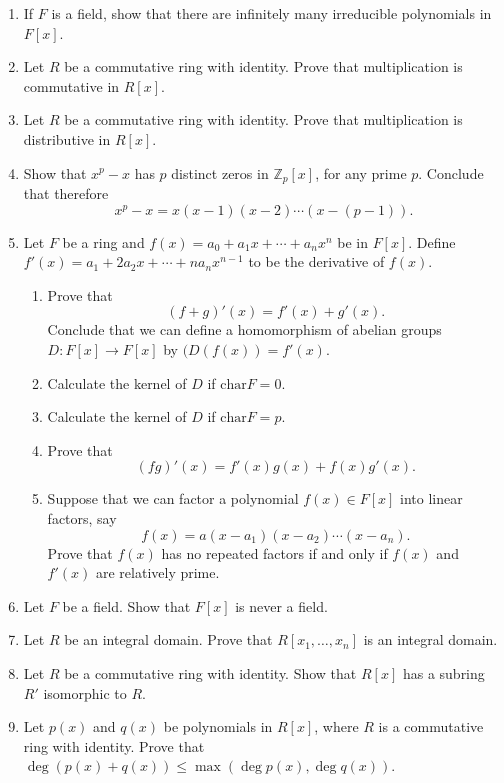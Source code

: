 {\begin{enumerate}
\item
If $F$ is a field, show that there are infinitely many irreducible polynomials in $F[x]$.

\item
Let $R$ be a commutative ring with identity. Prove that multiplication is commutative in $R[x]$.

\item
Let $R$ be a commutative ring with identity. Prove that multiplication is distributive in $R[x]$.
 
\item
Show that $x^p - x$ has $p$ distinct zeros in ${\mathbb Z}_p[x]$, for any prime $p$.  Conclude that therefore
\[
x^p-x = x(x-1)(x-2) \cdots (x - (p - 1)).
\]
 
\item
Let $F$ be a ring and $f(x) = a_0 + a_1 x + \cdots + a_n x^n$ be in $F[x]$. Define $f'(x) = a_1  + 2 a_2 x + \cdots + n a_n x^{n - 1}$ to be the {\bfi derivative\/} of $f(x)$. 
\begin{enumerate}
 
 \item
Prove that
\[
(f + g)'(x) = f'(x) + g'(x).
\]
Conclude that we can define a homomorphism of abelian groups $D : F[x] \rightarrow F[x]$ by $(D(f(x)) = f'(x)$.
 
 \item
Calculate the kernel of $D$ if $\mbox{char} F = 0$.
 
 \item
Calculate the kernel of $D$ if $\mbox{char} F = p$.
 
 \item
Prove that
\[
(fg)'(x) = f'(x)g(x) + f(x) g'(x).
\]
 
 \item
Suppose that we can factor a polynomial $f(x) \in F[x]$ into linear factors, say
\[
f(x) = a(x - a_1) (x - a_2) \cdots ( x - a_n).
\]
Prove that $f(x)$ has no repeated factors if and only if $f(x)$ and $f'(x)$ are relatively prime.
 
\end{enumerate}

\item
Let $F$ be a field. Show that $F[x]$ is never a field.

\item
Let $R$ be an integral domain.  Prove that $R[x_1, \ldots, x_n]$ is an integral domain.
 
\item
Let $R$ be a commutative ring with identity.  Show that $R[x]$ has a subring $R'$ isomorphic to $R$.
 
\item
Let $p(x)$ and $q(x)$ be polynomials in $R[x]$, where $R$ is a commutative ring with identity.  Prove that  $\deg( p(x) + q(x) ) \leq \max( \deg p(x), \deg q(x) )$. 

\end{enumerate}
}
 

